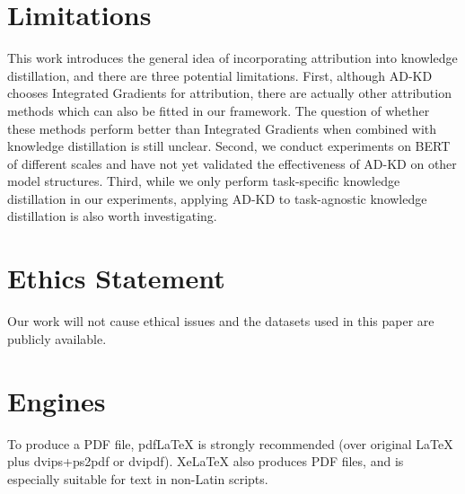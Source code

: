 \documentclass[11pt]{article}
\begin{document}
\section*{Limitations}
This work introduces the general idea of incorporating attribution into knowledge distillation, and there are three potential limitations. First, although AD-KD chooses Integrated Gradients for attribution, there are actually other attribution methods \citep{janizek2021explaining,sikdar-etal-2021-integrated} which can also be fitted in our framework. The question of whether these methods perform better than Integrated Gradients when combined with knowledge distillation is still unclear. Second, we conduct experiments on BERT of different scales and have not yet validated the effectiveness of AD-KD on other model structures. Third, while we only perform task-specific knowledge distillation in our experiments, applying AD-KD to task-agnostic knowledge distillation is also worth investigating.

\section*{Ethics Statement}
Our work will not cause ethical issues and the datasets used in this paper are publicly available.


\iffalse
\section{Engines}

To produce a PDF file, pdf\LaTeX{} is strongly recommended (over original \LaTeX{} plus dvips+ps2pdf or dvipdf). Xe\LaTeX{} also produces PDF files, and is especially suitable for text in non-Latin scripts.
\end{document}
